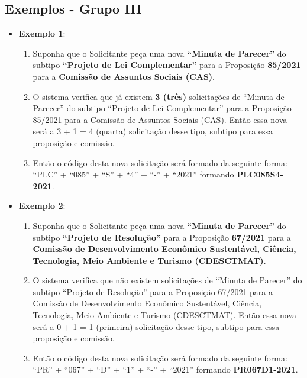 \subsection{Exemplos - Grupo III}


\begin{itemize}
	\item \textbf{Exemplo 1}:
	
	\begin{enumerate}
		\item Suponha que o Solicitante peça uma nova \textbf{``Minuta de Parecer''} do subtipo \textbf{``Projeto de Lei Complementar''} para a Proposição \textbf{85/2021} para a \textbf{Comissão de Assuntos Sociais (CAS)}.
				
		\item O sistema verifica que já existem \textbf{3 (três)} solicitações de ``Minuta de Parecer'' do subtipo ``Projeto de Lei Complementar'' para a Proposição 85/2021 para a Comissão de Assuntos Sociais (CAS). Então essa nova será a 3 + 1 = 4 (quarta) solicitação desse tipo, subtipo para essa proposição e comissão.
				
		\item Então o código desta nova solicitação será formado da seguinte forma: ``PLC'' + ``085'' + ``S'' + ``4'' + ``-'' + ``2021'' formando \textbf{PLC085S4-2021}.
	\end{enumerate}


	\item \textbf{Exemplo 2}:

\begin{enumerate}
	\item Suponha que o Solicitante peça uma nova \textbf{``Minuta de Parecer''} do subtipo \textbf{``Projeto de Resolução''} para a Proposição \textbf{67/2021} para a \textbf{Comissão de Desenvolvimento Econômico Sustentável, Ciência, Tecnologia, Meio Ambiente e Turismo (CDESCTMAT)}.
	
	\item O sistema verifica que não existem solicitações de ``Minuta de Parecer'' do subtipo ``Projeto de Resolução'' para a Proposição 67/2021 para a Comissão de Desenvolvimento Econômico Sustentável, Ciência, Tecnologia, Meio Ambiente e Turismo (CDESCTMAT). Então essa nova será a 0 + 1 = 1 (primeira) solicitação desse tipo, subtipo para essa proposição e comissão.
	
	\item Então o código desta nova solicitação será formado da seguinte forma: ``PR'' + ``067'' + ``D'' + ``1'' + ``-'' + ``2021'' formando \textbf{PR067D1-2021}.
\end{enumerate}


\end{itemize}









